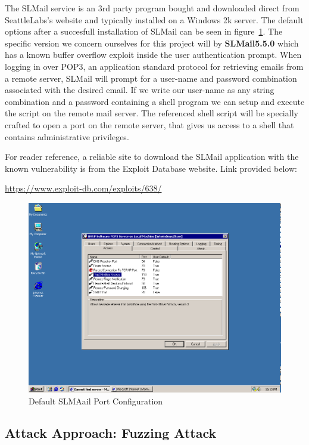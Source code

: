 \documentclass[12pt]{article}
\begin{document}
The SLMail service is an 3rd party program bought and downloaded direct
from SeattleLabs's website and typically installed on a Windows 2k server.
The default options after a succesfull installation of SLMail
can be seen in figure~\ref{fig:deafconfigslmail}. The specific version we 
concern ourselves for this project will by \textbf{SLMail5.5.0} which has a 
known buffer overflow exploit inside the user authentication prompt. When 
logging in over POP3, an application standard protocol for retrieving 
emails from a remote server, SLMail will prompt for a user-name and 
password combination associated with the desired email. If we write our 
user-name as any string combination and a password containing a shell program 
we can setup and execute the script on the remote mail server. The referenced 
shell script will be specially crafted to open a port on the remote server, 
that gives us access to a shell that contains administrative privileges. 

For reader reference, a reliable site to download the SLMail application 
with the known vulnerability is from the Exploit Database website. Link
provided below:

\url{https://www.exploit-db.com/exploits/638/}

\begin{figure}[ht]
    \centering
    \includegraphics[width=5.5in]{images/20160407_slmail_config.png}
    \caption{Default SLMAail Port Configuration}
    \label{fig:deafconfigslmail}
\end{figure}

\subsection{Attack Approach: Fuzzing Attack}
\label{sec:approachpassbuff}
\end{document}
